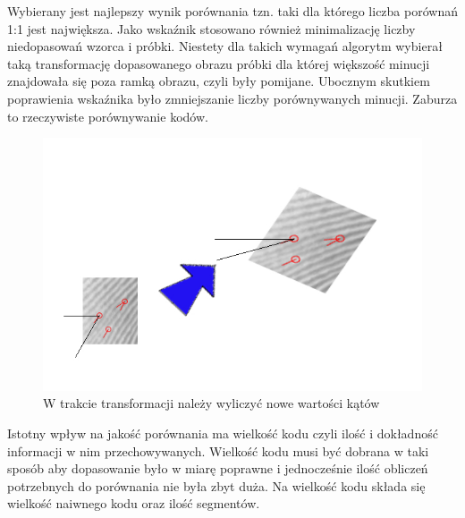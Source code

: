\vspace{.5cm}\par
Wybierany jest najlepszy wynik porównania tzn. taki dla którego liczba porównań 1:1 jest największa. Jako wskaźnik stosowano również
minimalizację liczby niedopasowań wzorca i próbki. Niestety dla takich wymagań algorytm wybierał taką transformację dopasowanego obrazu próbki dla której większość minucji znajdowała się poza ramką obrazu, czyli były pomijane.
Ubocznym skutkiem poprawienia wskaźnika było zmniejszanie liczby porównywanych minucji. Zaburza to rzeczywiste porównywanie kodów.
\begin{figure}[h]
    \begin{center}
	\includegraphics[angle=0,scale=.6]{img/angle_shift.jpg}
	\caption{W trakcie transformacji należy wyliczyć nowe wartości kątów}
	\label{angle_shift}
    \end{center}
\end{figure}

Istotny wpływ na jakość porównania ma wielkość kodu czyli ilość i dokładność informacji w nim przechowywanych. Wielkość kodu musi być dobrana w taki sposób aby dopasowanie było w miarę poprawne i 
jednocześnie ilość obliczeń potrzebnych do porównania nie była zbyt duża. Na wielkość kodu składa się wielkość naiwnego kodu oraz ilość segmentów.


